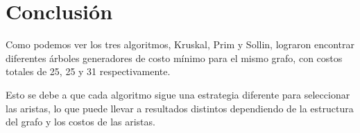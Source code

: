 \section{Conclusión}

Como podemos ver los tres algoritmos, Kruskal, Prim y Sollin, lograron encontrar
diferentes árboles generadores de costo mínimo para el mismo grafo, con costos 
totales de 25, 25 y 31 respectivamente.

Esto se debe a que cada algoritmo sigue una estrategia diferente para seleccionar 
las aristas, lo que puede llevar a resultados distintos dependiendo de la 
estructura del grafo y los costos de las aristas.